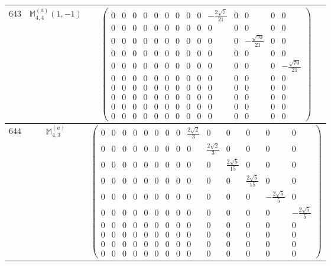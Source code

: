 \documentclass[fleqn,8pt,landscape]{jsarticle}
\begin{document}
\begin{center}
\begin{longtable}{ccc}
$ 643 $ & $ \mathbb{M}_{4,4}^{(a)}(1,-1) $ & $ \begin{pmatrix} 0 & 0 & 0 & 0 & 0 & 0 & 0 & 0 & 0 & - \frac{2 \sqrt{7}}{21} & 0 & 0 & 0 & 0 \\ 0 & 0 & 0 & 0 & 0 & 0 & 0 & 0 & 0 & 0 & 0 & 0 & 0 & 0 \\ 0 & 0 & 0 & 0 & 0 & 0 & 0 & 0 & 0 & 0 & 0 & - \frac{\sqrt{70}}{21} & 0 & 0 \\ 0 & 0 & 0 & 0 & 0 & 0 & 0 & 0 & 0 & 0 & 0 & 0 & 0 & 0 \\ 0 & 0 & 0 & 0 & 0 & 0 & 0 & 0 & 0 & 0 & 0 & 0 & 0 & - \frac{\sqrt{70}}{21} \\ 0 & 0 & 0 & 0 & 0 & 0 & 0 & 0 & 0 & 0 & 0 & 0 & 0 & 0 \\ 0 & 0 & 0 & 0 & 0 & 0 & 0 & 0 & 0 & 0 & 0 & 0 & 0 & 0 \\ 0 & 0 & 0 & 0 & 0 & 0 & 0 & 0 & 0 & 0 & 0 & 0 & 0 & 0 \\ 0 & 0 & 0 & 0 & 0 & 0 & 0 & 0 & 0 & 0 & 0 & 0 & 0 & 0 \\ 0 & 0 & 0 & 0 & 0 & 0 & 0 & 0 & 0 & 0 & 0 & 0 & 0 & 0 \end{pmatrix} $ \\ \hline
$ 644 $ & $ \mathbb{M}_{4,3}^{(a)} $ & $ \begin{pmatrix} 0 & 0 & 0 & 0 & 0 & 0 & 0 & 0 & \frac{2 \sqrt{2}}{3} & 0 & 0 & 0 & 0 & 0 \\ 0 & 0 & 0 & 0 & 0 & 0 & 0 & 0 & 0 & \frac{2 \sqrt{2}}{3} & 0 & 0 & 0 & 0 \\ 0 & 0 & 0 & 0 & 0 & 0 & 0 & 0 & 0 & 0 & \frac{2 \sqrt{5}}{15} & 0 & 0 & 0 \\ 0 & 0 & 0 & 0 & 0 & 0 & 0 & 0 & 0 & 0 & 0 & \frac{2 \sqrt{5}}{15} & 0 & 0 \\ 0 & 0 & 0 & 0 & 0 & 0 & 0 & 0 & 0 & 0 & 0 & 0 & - \frac{2 \sqrt{5}}{5} & 0 \\ 0 & 0 & 0 & 0 & 0 & 0 & 0 & 0 & 0 & 0 & 0 & 0 & 0 & - \frac{2 \sqrt{5}}{5} \\ 0 & 0 & 0 & 0 & 0 & 0 & 0 & 0 & 0 & 0 & 0 & 0 & 0 & 0 \\ 0 & 0 & 0 & 0 & 0 & 0 & 0 & 0 & 0 & 0 & 0 & 0 & 0 & 0 \\ 0 & 0 & 0 & 0 & 0 & 0 & 0 & 0 & 0 & 0 & 0 & 0 & 0 & 0 \\ 0 & 0 & 0 & 0 & 0 & 0 & 0 & 0 & 0 & 0 & 0 & 0 & 0 & 0 \end{pmatrix} $ \\ \hline

\end{longtable}
\end{center}
\end{document}

